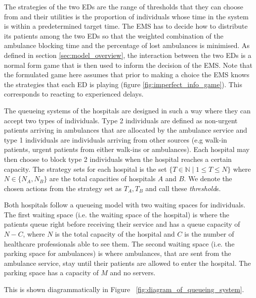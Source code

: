 The strategies of the two EDs are the range of thresholds that they can choose
from and their utilities is the proportion of individuals whose time in the 
system is within a predetermined target time.
The EMS has to decide how to distribute its patients among the two EDs so that 
the weighted combination of the ambulance blocking time and the percentage of 
lost ambulances is minimised. 
As defined in section \ref{sec:model_overview}, the interaction between the two
EDs is a normal form game that is then used to inform the decision of the EMS.
Note that the formulated game here assumes that prior to making a choice the 
EMS knows the strategies that each ED is playing (figure 
\ref{fig:imperfect_info_game}). 
This corresponds to reacting to experienced delays.


The queueing systems of the hospitals are designed in such a way where they can
accept two types
of individuals. 
Type 2 individuals are defined as non-urgent patients arriving in ambulances 
that are allocated by the ambulance service and 
type 1 individuals are individuals arriving from other sources 
(e.g walk-in patients, urgent patients from either walk-ins or ambulances).
Each hospital may then choose to block type 2 individuals 
when the hospital reaches a certain capacity. 
The strategy sets for each hospital is the set 
\( \{T \in \mathbb{N} \;|\; 1 \leq T \leq N\} \) where \(N \in\{N_A, N_B\}\) are 
the total capacities of hospitals \(A\) and \(B\). We denote the chosen actions 
from the strategy set as \(T_A, T_B\) and call these \textit{threshold}s.

Both hospitals follow a queueing model with two waiting spaces for 
individuals. 
The first waiting space (i.e. the waiting space of the hospital) is where the 
patients queue right before receiving 
their service and has a queue capacity of \( N - C \), where \(N\) is the total 
capacity of the hospital and \(C\) is the number of healthcare 
professionals able to see them.
The second waiting space (i.e. the parking space for ambulances) is where 
ambulances, that are sent from the
ambulance service, stay until their patients are allowed to enter the hospital.
The parking space has a capacity of \(M\) and no servers.

This is shown diagrammatically in Figure ~\ref{fig:diagram_of_queueing_system}.


